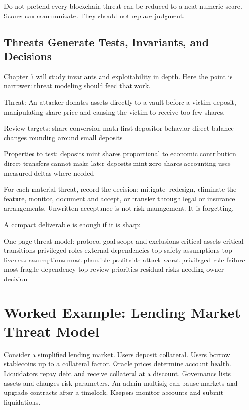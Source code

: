 Do not pretend every blockchain threat can be reduced to a neat numeric score. Scores can communicate. They should not replace judgment.

\subsection{Threats Generate Tests, Invariants, and Decisions}

Chapter 7 will study invariants and exploitability in depth. Here the point is narrower: threat modeling should feed that work.

\begin{codeblock}
Threat:
    An attacker donates assets directly to a vault before a victim deposit,
    manipulating share price and causing the victim to receive too few shares.

Review targets:
    share conversion math
    first-depositor behavior
    direct balance changes
    rounding around small deposits

Properties to test:
    deposits mint shares proportional to economic contribution
    direct transfers cannot make later deposits mint zero shares
    accounting uses measured deltas where needed
\end{codeblock}

For each material threat, record the decision: mitigate, redesign, eliminate the feature, monitor, document and accept, or transfer through legal or insurance arrangements. Unwritten acceptance is not risk management. It is forgetting.

A compact deliverable is enough if it is sharp:

\begin{codeblock}
One-page threat model:
    protocol goal
    scope and exclusions
    critical assets
    critical transitions
    privileged roles
    external dependencies
    top safety assumptions
    top liveness assumptions
    most plausible profitable attack
    worst privileged-role failure
    most fragile dependency
    top review priorities
    residual risks needing owner decision
\end{codeblock}

\section{Worked Example: Lending Market Threat Model}

Consider a simplified lending market. Users deposit collateral. Users borrow stablecoins up to a collateral factor. Oracle prices determine account health. Liquidators repay debt and receive collateral at a discount. Governance lists assets and changes risk parameters. An admin multisig can pause markets and upgrade contracts after a timelock. Keepers monitor accounts and submit liquidations.

